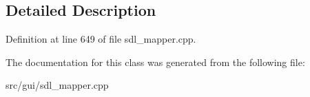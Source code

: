 \subsection{Detailed Description}


Definition at line 649 of file sdl\-\_\-mapper.\-cpp.



The documentation for this class was generated from the following file\-:\begin{DoxyCompactItemize}
\item 
src/gui/sdl\-\_\-mapper.\-cpp\end{DoxyCompactItemize}

